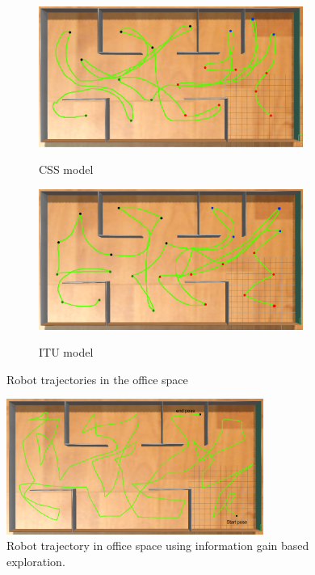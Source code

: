 \begin{figure}[!h]
\centering
	\begin{subfigure}[b]{\textwidth}
	    \centering
		\includegraphics[width=0.95\textwidth]{images/trajitu.png}
		\label{subfig:a}
		\caption{CSS model}
		\vspace{2em}
	\end{subfigure}
	\begin{subfigure}[b]{\textwidth}
	    \centering
		\includegraphics[width=0.95\textwidth]{images/trajcss.png}
		\label{subfig:b}
		\caption{ITU model}
	\end{subfigure}
\caption{Robot trajectories in the office space}
\end{figure}

\begin{figure}[!h]
    \centering
    \includegraphics[width=0.75\textwidth]{images/trajig1.png}
    \caption{Robot trajectory in office space using information gain based exploration.}
    \label{fig:info}
\end{figure}

